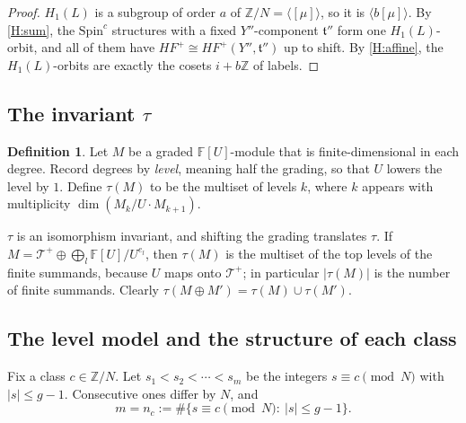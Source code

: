 \documentclass[11pt]{article}
\theoremstyle{definition}
\newtheorem{definition}[theorem]{Definition}
\newcommand{\F}{\mathbb{F}}
\newcommand{\Z}{\mathbb{Z}}
\newcommand{\Tp}{\mathcal{T}^+}
\newcommand{\HFp}{\mathit{HF}^+}
\newcommand{\Spinc}{\mathrm{Spin}^c}
\begin{document}
\begin{proof}
$H_1(L)$ is a subgroup of order $a$ of $\Z/N=\langle[\mu]\rangle$, so it is $\langle b[\mu]\rangle$. By \ref{H:sum}, the $\Spinc$ structures with a fixed $Y''$-component $\mathfrak t''$ form one $H_1(L)$-orbit, and all of them have $\HFp\cong\HFp(Y'',\mathfrak t'')$ up to shift. By \ref{H:affine}, the $H_1(L)$-orbits are exactly the cosets $i+b\Z$ of labels.
\end{proof}

\subsection{The invariant \texorpdfstring{$\tau$}{tau}}

\begin{definition}
Let $M$ be a graded $\F[U]$-module that is finite-dimensional in each degree. Record degrees by \emph{level}, meaning half the grading, so that $U$ lowers the level by $1$. Define $\tau(M)$ to be the multiset of levels $k$, where $k$ appears with multiplicity $\dim(M_k/U\cdot M_{k+1})$.
\end{definition}

$\tau$ is an isomorphism invariant, and shifting the grading translates $\tau$. If $M=\Tp\oplus\bigoplus_l\F[U]/U^{e_l}$, then $\tau(M)$ is the multiset of the top levels of the finite summands, because $U$ maps onto $\Tp$; in particular $|\tau(M)|$ is the number of finite summands. Clearly $\tau(M\oplus M')=\tau(M)\cup\tau(M')$.

\subsection{The level model and the structure of each class}

Fix a class $c\in\Z/N$. Let $s_1<s_2<\cdots<s_m$ be the integers $s\equiv c\pmod N$ with $|s|\le g-1$. Consecutive ones differ by $N$, and
\[
m=n_c:=\#\{s\equiv c\pmod N:\ |s|\le g-1\}.
\]
\end{document}
